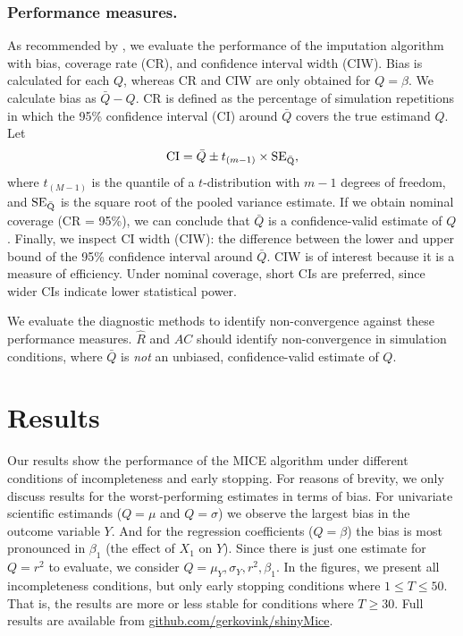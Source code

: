 \documentclass[Royal,times,sageh]{sagej}
\begin{document}
\hypertarget{performance-measures.}{%
\subsubsection{Performance measures.}\label{performance-measures.}}

As recommended by \citet{buur18}, we evaluate the performance of the imputation algorithm with bias, coverage rate (CR), and confidence interval width (CIW). Bias is calculated for each \(Q\), whereas CR and CIW are only obtained for \(Q = \beta\). We calculate bias as \(\bar{Q} - Q\). CR is defined as the percentage of simulation repetitions in which the 95\% confidence interval (CI) around \(\bar{Q}\) covers the true estimand \(Q\). Let
\[\text{CI} = \bar{Q} \pm t_{(m-1)} \times \rm SE_{\bar{Q}},\]
where \(t_{(M-1)}\) is the quantile of a \(t\)-distribution with \(m-1\) degrees of freedom, and \(\rm SE_{\bar{Q}}\) is the square root of the pooled variance estimate. If we obtain nominal coverage (CR = 95\%), we can conclude that \(\bar{Q}\) is a confidence-valid estimate of \(Q\). Finally, we inspect CI width (CIW): the difference between the lower and upper bound of the 95\% confidence interval around \(\bar{Q}\). CIW is of interest because it is a measure of efficiency. Under nominal coverage, short CIs are preferred, since wider CIs indicate lower statistical power.

We evaluate the diagnostic methods to identify non-convergence against these performance measures. \(\widehat{R}\) and \(AC\) should identify non-convergence in simulation conditions, where \(\bar{Q}\) is \emph{not} an unbiased, confidence-valid estimate of \(Q\).

\hypertarget{results}{%
\section{Results}\label{results}}

Our results show the performance of the MICE algorithm under different conditions of incompleteness and early stopping. For reasons of brevity, we only discuss results for the worst-performing estimates in terms of bias. For univariate scientific estimands (\(Q=\mu\) and \(Q=\sigma\)) we observe the largest bias in the outcome variable \(Y\). And for the regression coefficients (\(Q=\beta\)) the bias is most pronounced in \(\beta_1\) (the effect of \(X_1\) on \(Y\)). Since there is just one estimate for \(Q=r^2\) to evaluate, we consider \(Q=\mu_Y, \sigma_Y,r^2, \beta_1\). In the figures, we present all incompleteness conditions, but only early stopping conditions where \(1 \leq T\leq50\). That is, the results are more or less stable for conditions where \(T \geq 30\). Full results are available from \href{https://github.com/gerkovink/shinyMice/tree/master/3.Thesis/}{github.com/gerkovink/shinyMice}.
\end{document}
